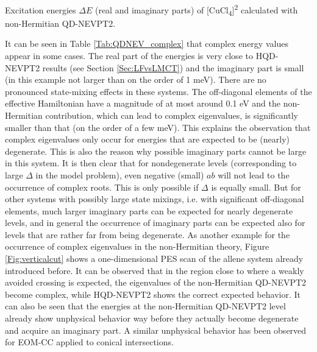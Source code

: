 \begin{table}
\small
\centering
\ttabbox
{\caption[Excitation energies (real and imaginary parts) of {[CuCl\textsubscript{4}]}\textsuperscript{2\textminus} calculated with non-Hermitian QD-NEVPT2.]{Excitation energies $\Delta E$ (real and imaginary parts) of [CuCl\textsubscript{4}]\textsuperscript{2\textminus} calculated with non-Hermitian QD-NEVPT2.}
\label{Tab:QDNEV_complex}}
{}
\end{table}
It can be seen in Table \ref{Tab:QDNEV_complex} that complex energy values appear in some cases. The real part of the energies is very close to HQD-NEVPT2 results (see Section \ref{Sec:LFvsLMCT}) and the imaginary part is small (in this example not larger than on the order of 1 meV). There are no pronounced state-mixing effects in these systems. The off-diagonal elements of the effective Hamiltonian have a magnitude of at most around 0.1 eV and the non-Hermitian contribution, which can lead to complex eigenvalues, is significantly smaller than that (on the order of a few meV). This explains the observation that complex eigenvalues only occur for energies that are expected to be (nearly) degenerate. This is also the reason why possible imaginary parts cannot be large in this system. It is then clear that for nondegenerate levels (corresponding to large $\Delta$ in the model problem), even negative (small) $ab$ will not lead to the occurrence of complex roots. This is only possible if $\Delta$ is equally small. But for other systems with possibly large state mixings, i.e. with significant off-diagonal elements, much larger imaginary parts can be expected for nearly degenerate levels, and in general the occurrence of imaginary parts can be expected also
for levels that are rather far from being degenerate. 
As another example for the occurrence of complex eigenvalues in the non-Hermitian theory, Figure \ref{Fig:verticalcut} shows a one-dimensional PES scan of the allene system already introduced before. It can be observed that in the region close to where a weakly avoided crossing is expected, the eigenvalues of the non-Hermitian QD-NEVPT2 become complex, while HQD-NEVPT2 shows the correct expected behavior. It can also be seen that the energies at the non-Hermitian QD-NEVPT2 level already show unphysical behavior way before they actually become degenerate and acquire an imaginary part. A similar unphysical behavior has been observed for EOM-CC applied to conical intersections.\cite{KoehnT_2007_44105}
